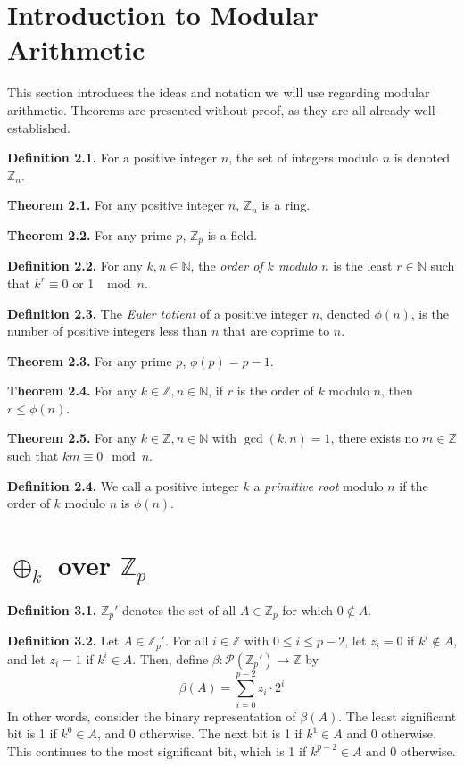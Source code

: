 \documentclass{article}
\newcommand{\zee}{\mathbb{Z}}
\newcommand{\N}{\mathbb{N}}
\begin{document}
\setcounter{section}{1}
\section{Introduction to Modular Arithmetic}

This section introduces the ideas and notation we will use regarding
modular arithmetic.
Theorems are presented without proof,
as they are all already well-established.

\textbf{Definition 2.1.} For a positive integer $n$, the set of integers
modulo $n$ is denoted $\zee_n$.

\textbf{Theorem 2.1.} For any positive integer $n$, $\zee_n$ is a ring.

\textbf{Theorem 2.2.} For any prime $p$, $\zee_p$ is a field.

\textbf{Definition 2.2.} For any $k, n \in \N$, the \textit{order
of $k$ modulo $n$} is the least $r \in \N$ such that
$k^r \equiv 0$ or 1 $\mod n$.

\textbf{Definition 2.3.} The \textit{Euler totient} of a
positive integer $n$,
denoted $\phi(n)$, is the number of positive integers less than $n$
that are coprime to $n$.

\textbf{Theorem 2.3.} For any prime $p$, $\phi(p) = p - 1$.

\textbf{Theorem 2.4.} For any $k \in \zee, n \in \N$, if $r$ is the order of
$k$ modulo $n$, then $r \leq \phi(n)$.

\textbf{Theorem 2.5.} For any $k \in \zee, n \in \N$ with
$\gcd(k, n) = 1$, there exists no $m \in \zee$ such that
$km \equiv 0 \mod n$.

\textbf{Definition 2.4.} We call a positive integer $k$ a
\textit{primitive root} modulo $n$ if the order of $k$ modulo $n$
is $\phi(n)$.

\section{$\oplus_k$ over $\zee_p$}

\textbf{Definition 3.1.} $\zee_p'$ denotes the set of all
$A \in \zee_p$ for which $0 \not\in A$.

\textbf{Definition 3.2.} Let $A \in \zee_p'$. For all $i \in \zee$
with $0 \leq i \leq p - 2$, let $z_i = 0$ if $k^i \not\in A$,
and let $z_i = 1$ if $k^i \in A$. Then, define
$\beta: \mathcal{P}(\zee_p') \rightarrow \zee$ by
\[\beta(A) = \sum_{i = 0}^{p-2} z_i \cdot 2^{i}\]
In other words, consider the binary representation of $\beta(A)$.
The least significant bit is 1 if $k^0 \in A$, and 0 otherwise.
The next bit is 1 if $k^1 \in A$ and 0 otherwise.
This continues to the most significant bit,
which is 1 if $k^{p-2} \in A$ and 0 otherwise.
\end{document}
